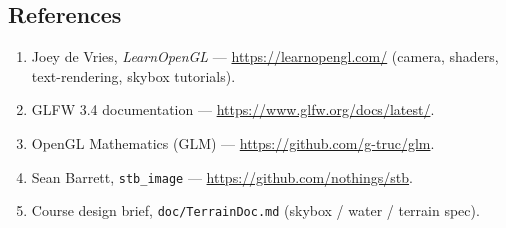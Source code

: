 \documentclass[11pt]{article}
\begin{document}
\subsection*{References}
\begin{enumerate}[leftmargin=1.5em]
  \item Joey de Vries, \emph{LearnOpenGL} --- \url{https://learnopengl.com/}
        (camera, shaders, text-rendering, skybox tutorials).
  \item GLFW 3.4 documentation --- \url{https://www.glfw.org/docs/latest/}.
  \item OpenGL Mathematics (GLM) --- \url{https://github.com/g-truc/glm}.
  \item Sean Barrett, \texttt{stb\_image} --- \url{https://github.com/nothings/stb}.
  \item Course design brief, \texttt{doc/TerrainDoc.md} (skybox / water / terrain spec).
\end{enumerate}
\end{document}

